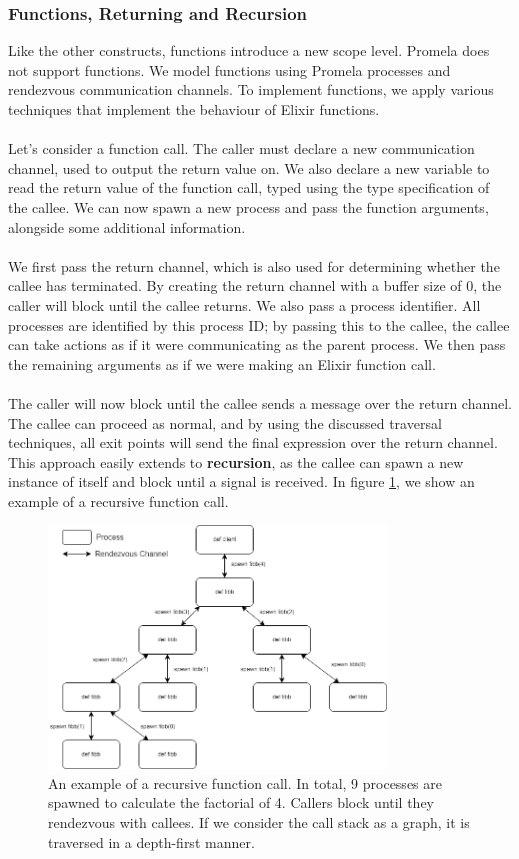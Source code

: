 \subsubsection{Functions, Returning and Recursion}
Like the other constructs, functions introduce a new scope level. Promela does not support functions. We model functions using Promela processes and rendezvous communication channels. To implement functions, we apply various techniques that implement the behaviour of Elixir functions. 
\\ \\
Let's consider a function call. The caller must declare a new communication channel, used to output the return value on. We also declare a new variable to read the return value of the function call, typed using the type specification of the callee. We can now spawn a new process and pass the function arguments, alongside some additional information. 
\\ \\
We first pass the return channel, which is also used for determining whether the callee has terminated. By creating the return channel with a buffer size of 0, the caller will block until the callee returns. We also pass a process identifier. All processes are identified by this process ID; by passing this to the callee, the callee can take actions as if it were communicating as the parent process. We then pass the remaining arguments as if we were making an Elixir function call. 
\\ \\
The caller will now block until the callee sends a message over the return channel. The callee can proceed as normal, and by using the discussed traversal techniques, all exit points will send the final expression over the return channel. This approach easily extends to \textbf{recursion}, as the callee can spawn a new instance of itself and block until a signal is received. In figure \ref{fig:function_call}, we show an example of a recursive function call.
\begin{figure}[h]
    \centering
    \includegraphics[width=0.8\textwidth]{images/function_call.drawio.png}
    \caption{An example of a recursive function call. In total, 9 processes are spawned to calculate the factorial of 4. Callers block until they rendezvous with callees. If we consider the call stack as a graph, it is traversed in a depth-first manner.}
    \label{fig:function_call}
\end{figure}
